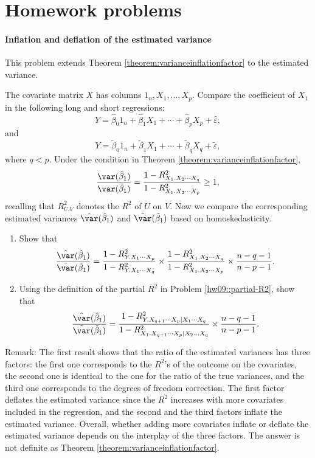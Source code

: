  

\section{Homework problems}


\paragraph{Inflation and deflation of the estimated variance}\label{hw12::inf-def-est-var}

This problem extends Theorem \ref{theorem:varianceinflationfactor} to the estimated variance. 

The covariate matrix $X$ has columns $1_n, X_1, \ldots, X_p$. 
Compare the coefficient of $X_1$ in the following long and short regressions:
$$
Y = \hat{\beta}_0 1_n  + \hat{\beta}_1 X_1 + \cdots + \hat{\beta}_p X_p  +\hat \varepsilon,
$$
and 
$$ 
Y =\tilde{\beta}_0 1_n  +  \tilde{\beta}_1 X_1 + \cdots + \tilde{\beta}_q  X_q   +\tilde \varepsilon,
$$
where $q < p$. Under the condition in Theorem \ref{theorem:varianceinflationfactor}, 
$$  \frac { \var( \hat{\beta}_1 ) }{  \var( \tilde{\beta}_1 ) }
 = \frac{  1- R^2_{X_1.X_2\cdots X_q}  }{  1- R^2_{X_1.X_2\cdots X_p}   } \geq 1 ,
$$
recalling that $R^2_{U.V}$ denotes the $R^2$ of $U$ on $V$. 
Now we compare the corresponding estimated variances $\hat \var( \hat{\beta}_1 )$ and $\tilde \var( \tilde{\beta}_1 )$ based on homoskedasticity. 

\begin{enumerate}
\item
Show that
$$
\frac{\hat \var( \hat{\beta}_1 )}{  \tilde \var( \tilde{\beta}_1 ) }
=   \frac{   1 - R^2_{Y.X_1\cdots X_p}  }{  1 - R^2_{Y.X_1\cdots X_q}  } \times  \frac{  1- R^2_{X_1.X_2\cdots X_q}  }{  1- R^2_{X_1.X_2\cdots X_p}   }  \times \frac{n-q - 1}{n-p - 1}    . 
$$


\item
Using the definition of the partial $R^2$ in Problem \ref{hw09::partial-R2}, show that
$$
\frac{\hat \var( \hat{\beta}_1 )}{  \tilde \var( \tilde{\beta}_1 ) }
=    \frac{   1 - R^2_{Y.X_{q+1} \cdots X_p  \mid  X_1\cdots X_q}  }{  1 - R^2_{ X_1.X_{q+1}\cdots X_p \mid  X_2\ldots X_q}  }  
\times  \frac{n-q - 1}{n-p - 1} .
$$
\end{enumerate}









Remark: The first result shows that the ratio of the estimated variances has three factors: the first one corresponds to the $R^2$'s of the outcome on the covariates,  the second one is identical to the one for the ratio of the true variances, and the third one corresponds to the degrees of freedom correction. The first factor deflates the estimated variance since the $R^2$ increases with more covariates included in the regression, and the second and the third factors inflate the estimated variance. Overall, whether adding more covariates inflate or deflate the estimated variance depends on the interplay of the three factors. The answer is not definite as Theorem \ref{theorem:varianceinflationfactor}. 



